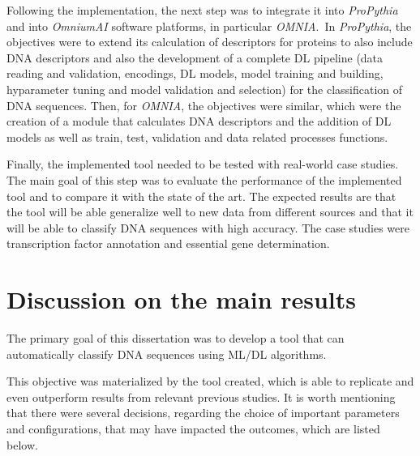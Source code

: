 Following the implementation, the next step was to integrate it into \textit{ProPythia} and into \textit{OmniumAI} software platforms, in particular \textit{OMNIA}. In \textit{ProPythia}, the objectives were to extend its calculation of descriptors for proteins to also include \gls{DNA} descriptors and also the development of a complete \gls{DL} pipeline (data reading and validation, encodings, \gls{DL} models, model training and building, hyparameter tuning and model validation and selection) for the classification of \gls{DNA} sequences. Then, for \textit{OMNIA}, the objectives were similar, which were the creation of a module that calculates \gls{DNA} descriptors and the addition of \gls{DL} models as well as train, test, validation and data related processes functions. %

Finally, the implemented tool needed to be tested with real-world case studies. The main goal of this step was to evaluate the performance of the implemented tool and to compare it with the state of the art. The expected results are that the tool will be able generalize well to new data from different sources and that it will be able to classify \gls{DNA} sequences with high accuracy. The case studies were transcription factor annotation and essential gene determination. %


\section{Discussion on the main results}

The primary goal of this dissertation was to develop a tool that can automatically classify \gls{DNA} sequences using \gls{ML}/\gls{DL} algorithms. 

This objective was materialized by the tool created, which is able to replicate and even outperform results from relevant previous studies. It is worth mentioning that there were several decisions, regarding the choice of important parameters and configurations, that may have impacted the outcomes, which are listed below.

